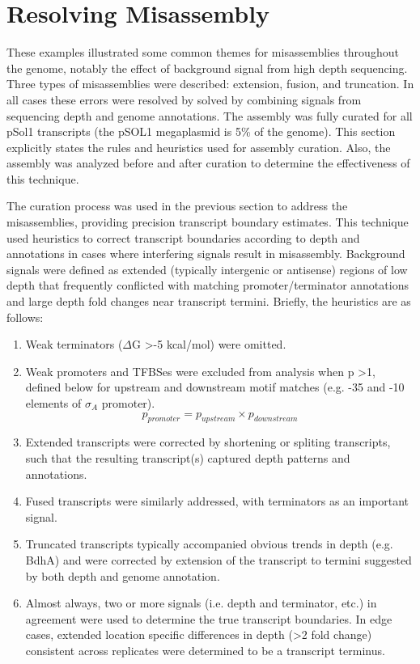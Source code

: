 
\section{Resolving Misassembly}

These examples illustrated some common themes for misassemblies throughout the genome, notably the effect of background signal from high depth sequencing. Three types of misassemblies were described: extension, fusion, and truncation. In all cases these errors were resolved by solved by combining signals from sequencing depth and genome annotations. The assembly was fully curated for all pSol1 transcripts (the pSOL1 megaplasmid is 5\% of the genome). This section explicitly states the rules and heuristics used for assembly curation. Also, the assembly was analyzed before and after curation to determine the effectiveness of this technique. 

The curation process was used in the previous section to address the misassemblies, providing precision transcript boundary estimates. This technique used heuristics to correct transcript boundaries according to depth and annotations in cases where interfering signals result in misassembly. Background signals were defined as extended (typically intergenic or antisense) regions of low depth that frequently conflicted with matching promoter/terminator annotations and large depth fold changes near transcript termini. Briefly, the heuristics are as follows:

\begin{enumerate}
\item Weak terminators ($\Delta$G \textgreater  -5 kcal/mol) were omitted.
\item Weak promoters and TFBSes were excluded from analysis when p \textgreater 1, defined below for upstream and downstream motif matches (e.g. -35 and -10 elements of $\sigma_{A}$ promoter). 
\[ p_{promoter} = p_{upstream} \times p_{downstream} \]
\item Extended transcripts were corrected by shortening or spliting transcripts, such that the resulting transcript(s) captured depth patterns and annotations.
\item Fused transcripts were similarly addressed, with terminators as an important signal.
\item Truncated transcripts typically accompanied obvious trends in depth (e.g. BdhA) and were corrected by extension of the transcript to termini suggested by both depth and genome annotation.
\item Almost always, two or more signals (i.e. depth and terminator, etc.) in agreement were used to determine the true transcript boundaries. In edge cases, extended location specific differences in depth (\textgreater 2 fold change) consistent across replicates were determined to be a transcript terminus.
\end{enumerate}


